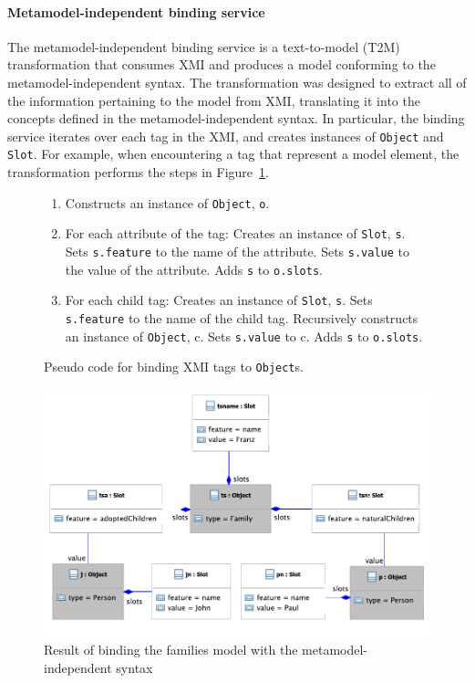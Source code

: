 \paragraph{Metamodel-independent binding service} The metamodel-independent binding service is a text-to-model (T2M) transformation that consumes XMI and produces a model conforming to the metamodel-independent syntax. The transformation was designed to extract all of the information pertaining to the model from XMI, translating it into the concepts defined in the metamodel-independent syntax. In particular, the binding service iterates over each tag in the XMI, and creates instances of \texttt{Ob\-je\-ct} and \texttt{Sl\-ot}. For example, when encountering a tag that represent a model element, the transformation performs the steps in Figure~\ref{fig:binding_objects}.

\begin{figure}[p]
	\begin{framed}
		\begin{enumerate}
			\item Constructs an instance of \texttt{Ob\-je\-ct}, \texttt{o}.
			\item For each attribute of the tag:
			\subitem Creates an instance of \texttt{Sl\-ot}, \texttt{s}.
			\subitem Sets \texttt{s.feature} to the name of the attribute.
			\subitem Sets \texttt{s.value} to the value of the attribute.
			\subitem Adds \texttt{s} to \texttt{o.slots}.
			\item For each child tag:
			\subitem Creates an instance of \texttt{Sl\-ot}, \texttt{s}.
			\subitem Sets \texttt{s.feature} to the name of the child tag.
			\subitem Recursively constructs an instance of \texttt{Ob\-je\-ct}, c.
			\subitem Sets \texttt{s.value} to c.
			\subitem Adds \texttt{s} to \texttt{o.slots}.
		\end{enumerate}
	\end{framed}
	\caption{Pseudo code for binding XMI tags to \texttt{Ob\-je\-ct}s.}
  \label{fig:binding_objects}
\end{figure}

\begin{figure}[p]
  \centering
  \includegraphics[width=12cm]{5.Implementation/images/generic_binding.pdf}
  \caption{Result of binding the families model with the metamodel-independent syntax}
  \label{fig:generic_binding}
\end{figure}

